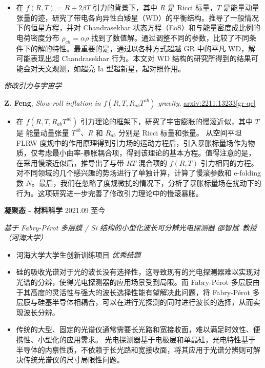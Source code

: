 \documentclass[12pt]{article}
\begin{document}
\begin{itemize}[noitemsep,nolistsep]
    \item 在 $f\left(R, T\right) = R + 2 \beta T$ 引力的背景下，其中 $R$ 是 Ricci 标量，$T$ 是能量动量张量的迹，研究了带电各向异性白矮星（WD）的平衡结构。推导了一般情况下的恒星方程，并对 Chandrasekhar 状态方程（EoS）和与能量密度成比例的电荷密度分布 $\rho_{ch} = \alpha \rho$ 找到了数值解。通过调整不同的参数，比较了不同条件下的解的特性。最重要的是，通过以各种方式超越 GR 中的平凡 WD，解可能表现出超 Chandrasekhar 行为。本文对 WD 结构的研究所得到的结果可能会对天文观测，如超亮 Ia 型超新星，起对照作用。
\end{itemize}

\smallskip \quad \textit{修改引力与宇宙学}

\textbf{Z. Feng}, \textit{Slow-roll inflation in $f\left(R, T, R_{ab}T^{ab}\right)$ gravity}, \href{https://arxiv.org/abs/2211.13233}{arxiv:2211.13233[gr-qc]}

\begin{itemize}[noitemsep,nolistsep]
    \item 在 $f\left(R, T, R_{ab}T^{ab}\right)$ 引力理论的框架下，研究了宇宙膨胀的慢滚近似，其中 $T$ 是 能量动量张量 $T^{ab}$、$R$ 和 $R_{ab}$ 分别是 Ricci 标量和张量。 从空间平坦 FLRW 度规中的作用原理得到引力场的运动方程后，引入暴胀标量场作为物质，仅考虑最小曲率-暴胀耦合项，得到该理论的基本方程。值得注意的是，在采用慢滚近似后，推导出了与带 $RT$ 混合项的 $f(R, T)$ 引力相同的方程。对不同领域的几个感兴趣的势场进行了单独计算，计算了慢滚参数和 e-folding 数 $N$。最后，我们在忽略了度规微扰的情况下，分析了暴胀标量场在扰动下的行为。这项研究进一步完善了修改引力理论中的慢滚暴胀。
\end{itemize}

\medskip \textbf{凝聚态 - 材料科学} \hfill 2021.09 至今

\smallskip \quad \textit{基于 Fabry-P\'{e}rot 多层膜 / Si 结构的小型化波长可分辨光电探测器 \hfill 邵智斌\ 教授（河海大学）}

\begin{itemize}[noitemsep,nolistsep]
    \item 河海大学大学生创新训练项目 \textit{优秀结题}
    \item 硅的吸收光谱对于光的波长没有选择性，这导致现有的光电探测器难以实现对光谱的分辨，使得光电探测器的应用场景受到局限。而 Fabry-P\'{e}rot 多层膜由于其高度的灵活性与强大的波长选择性能有望解决此问题，将 Fabry-P\'{e}rot 多层膜与硅基半导体相耦合，可以在进行光探测的同时进行波长的选择，从而实现波长分辨。
    \item 传统的大型、固定的光谱仪通常需要长光路和宽接收面，难以满足时效性、便携性、小型化的应用需求。 光电探测器基于电极层和单晶硅，光电特性基于半导体的内禀性质，不依赖于长光路和宽接收面，将其应用于光谱分辨则可解决传统光谱仪的尺寸局限性问题。
\end{itemize}
\end{document}
